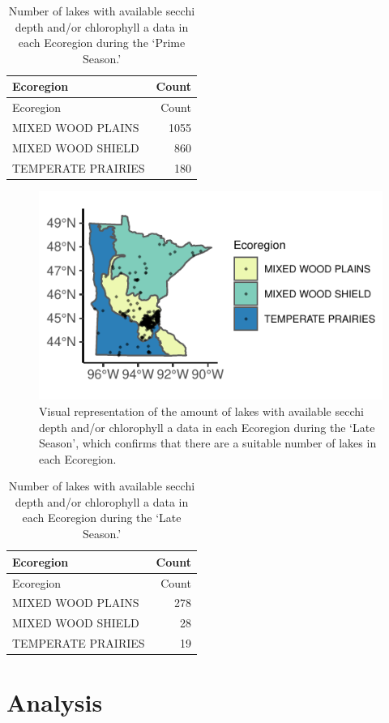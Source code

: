 \documentclass[12pt,]{article}
\begin{document}
\begin{longtable}[]{@{}lr@{}}
\caption{Number of lakes with available secchi depth and/or chlorophyll
a data in each Ecoregion during the `Prime Season.'}\tabularnewline
\toprule
Ecoregion & Count\tabularnewline
\midrule
\endfirsthead
\toprule
Ecoregion & Count\tabularnewline
\midrule
\endhead
MIXED WOOD PLAINS & 1055\tabularnewline
MIXED WOOD SHIELD & 860\tabularnewline
TEMPERATE PRAIRIES & 180\tabularnewline
\bottomrule
\end{longtable}

\begin{figure}
\centering
\includegraphics{Bollt_Greif_Raby_Roth_Project_Final_files/figure-latex/unnamed-chunk-14-1.pdf}
\caption{Visual representation of the amount of lakes with available
secchi depth and/or chlorophyll a data in each Ecoregion during the
`Late Season', which confirms that there are a suitable number of lakes
in each Ecoregion.}
\end{figure}

\begin{longtable}[]{@{}lr@{}}
\caption{Number of lakes with available secchi depth and/or chlorophyll
a data in each Ecoregion during the `Late Season.'}\tabularnewline
\toprule
Ecoregion & Count\tabularnewline
\midrule
\endfirsthead
\toprule
Ecoregion & Count\tabularnewline
\midrule
\endhead
MIXED WOOD PLAINS & 278\tabularnewline
MIXED WOOD SHIELD & 28\tabularnewline
TEMPERATE PRAIRIES & 19\tabularnewline
\bottomrule
\end{longtable}

\newpage

\hypertarget{analysis}{%
\section{Analysis}\label{analysis}}
\end{document}
